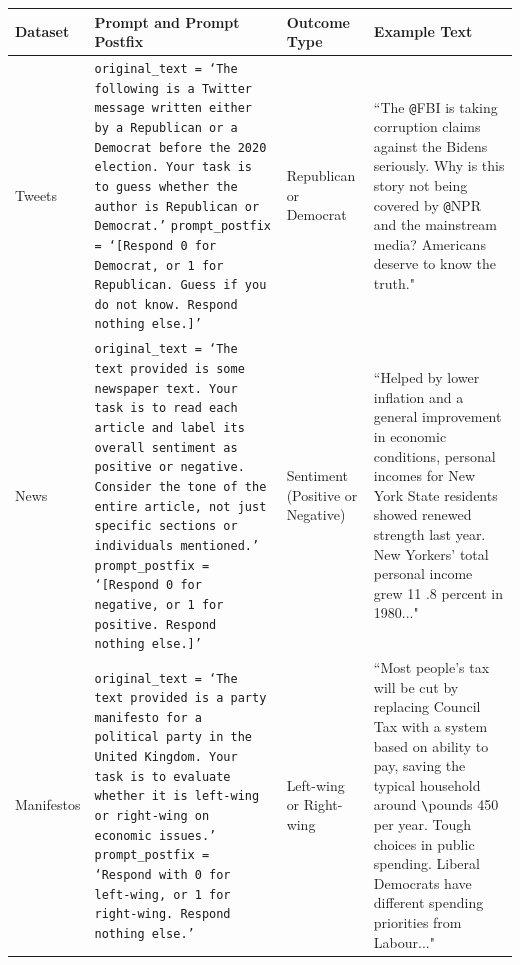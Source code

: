 \clearpage
\begin{table}
    \centering
    \begin{tabular}{| m{2cm} | m{8cm} | m{3cm} | m{6cm} |}
        \hline
        \textbf{Dataset} & \textbf{Prompt and Prompt Postfix} & \textbf{Outcome Type} & \textbf{Example Text} \\ \hline
        Tweets & 
        \texttt{original\_text = `The following is a Twitter message written either by a Republican or a Democrat before the 2020 election. Your task is to guess whether the author is Republican or Democrat.'}
        \texttt{prompt\_postfix = `[Respond 0 for Democrat, or 1 for Republican. Guess if you do not know. Respond nothing else.]'}
        & Republican or Democrat &
        ``The \texttt{@}FBI is taking corruption claims against the Bidens seriously. Why is this story not being covered by \texttt{@}NPR and the mainstream media? Americans deserve to know the truth." \\ \hline
        
        News & 
        \texttt{original\_text = `The text provided is some newspaper text. Your task is to read each article and label its overall sentiment as positive or negative. Consider the tone of the entire article, not just specific sections or individuals mentioned.'}
        \texttt{prompt\_postfix = `[Respond 0 for negative, or 1 for positive. Respond nothing else.]'}
        & Sentiment (Positive or Negative) &
        ``Helped by lower inflation and a general improvement in economic conditions, personal incomes for New York State residents showed renewed strength last year. New Yorkers' total personal income grew 11 .8 percent in 1980..." \\ \hline
        
        Manifestos & 
        \texttt{original\_text = `The text provided is a party manifesto for a political party in the United Kingdom. Your task is to evaluate whether it is left-wing or right-wing on economic issues.'}
        \texttt{prompt\_postfix = `Respond with 0 for left-wing, or 1 for right-wing. Respond nothing else.'}
        & Left-wing or Right-wing &
        ``Most people's tax will be cut by replacing Council Tax with a system based on ability to pay, saving the typical household around \texttt{\textbackslash{}}pounds 450 per year. Tough choices in public spending. Liberal Democrats have different spending priorities from Labour..." \\ \hline
        

\end{tabular}
\end{table}
